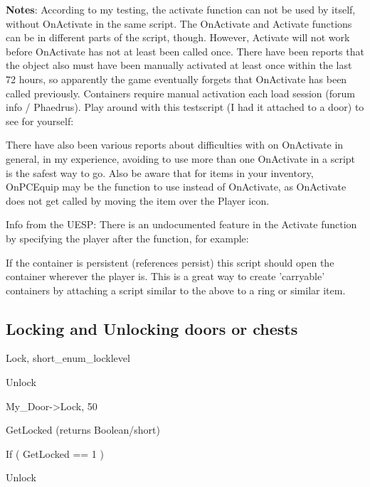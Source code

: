 \documentclass[
]{article}
\begin{document}


\textbf{Notes}: According to my testing, the activate function can not be used by itself, without OnActivate in the same script. The OnActivate and Activate functions can be in different parts of the script, though. However, Activate will not work before OnActivate has not at least been called once. There have been reports that the object also must have been manually activated at least once within the last 72 hours, so apparently the game eventually forgets that OnActivate has been called previously. Containers require manual activation each load session (forum info / Phaedrus). Play around with this testscript (I had it attached to a door) to
see for yourself:



There have also been various reports about difficulties with on
OnActivate in general, in my experience, avoiding to use more than one
OnActivate in a script is the safest way to go. Also be aware that for
items in your inventory, OnPCEquip may be the function to use instead of
OnActivate, as OnActivate does not get called by moving the item over
the Player icon.

Info from the UESP: There is an undocumented feature in the Activate
function by specifying the player after the function, for example:



If the container is persistent (references persist) this script should
open the container wherever the player is. This is a great way to create
'carryable' containers by attaching a script similar to the above to a
ring or similar item.

\hypertarget{locking-and-unlocking-doors-or-chests}{%
\subsection{\texorpdfstring{\hfill\break
Locking and Unlocking doors or
chests}{ Locking and Unlocking doors or chests}}\label{locking-and-unlocking-doors-or-chests}}

Lock, short\_enum\_locklevel

Unlock

My\_Door-\textgreater Lock, 50

GetLocked (returns Boolean/short)

If ( GetLocked == 1 )

Unlock
\end{document}
